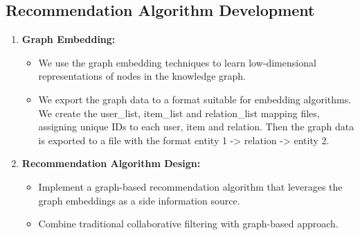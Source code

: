 \documentclass{article}
\begin{document}
\subsection{Recommendation Algorithm Development}
\begin{enumerate}
      \item \textbf{Graph Embedding:}
            \begin{itemize}
                  \item We use the graph embedding techniques to learn
                        low-dimensional
                        representations of nodes in the knowledge graph.
                  \item We export the graph data to a format suitable for
                        embedding
                        algorithms. We create the user\_list, item\_list and relation\_list mapping files, assigning unique IDs to each user, item and relation. Then the graph data is exported to a file with the format entity 1 -> relation -> entity 2.
            \end{itemize}

      \item \textbf{Recommendation Algorithm Design:}
            \begin{itemize}
                  \item Implement a graph-based recommendation algorithm that
                        leverages
                        the graph embeddings as a side information source.
                  \item Combine traditional collaborative filtering with
                        graph-based
                        approach.
            \end{itemize}

\end{enumerate}
\end{document}
